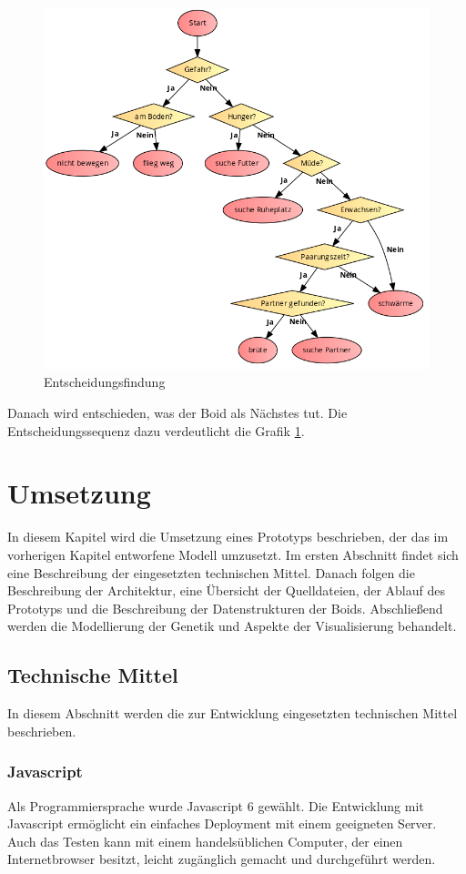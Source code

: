 \documentclass[draft=false
              ,paper=a4
              ,twoside=false
              ,fontsize=11pt
              ,headsepline
              ,BCOR10mm
              ,DIV11
              ,bibtotoc
              ,liststotoc
              ]{scrbook}
\begin{document}
\begin{figure}[!h]
\centering
\includegraphics[scale=0.6]{code2flow/entscheidungsfindung.png}
\caption{Entscheidungsfindung}
\label{entscheidung}
\end{figure}

Danach wird entschieden, was der Boid als Nächstes tut. Die Entscheidungssequenz dazu verdeutlicht die Grafik \ref{entscheidung}.

\chapter{Umsetzung}\label{umsetzung}
In diesem Kapitel wird die Umsetzung eines Prototyps beschrieben, der das im vorherigen Kapitel entworfene Modell umzusetzt. Im ersten Abschnitt findet sich eine Beschreibung der eingesetzten technischen Mittel. Danach folgen die Beschreibung der Architektur, eine Übersicht der Quelldateien, der Ablauf des Prototyps und die Beschreibung der Datenstrukturen der Boids. Abschließend werden die Modellierung der Genetik und Aspekte der Visualisierung behandelt.
\section{Technische Mittel}
In diesem Abschnitt werden die zur Entwicklung eingesetzten technischen Mittel beschrieben.
\subsection{Javascript}
Als Programmiersprache wurde Javascript 6 gewählt. Die Entwicklung mit Javascript ermöglicht ein einfaches Deployment mit einem geeigneten Server. Auch das Testen kann mit einem handelsüblichen Computer, der einen Internetbrowser besitzt, leicht zugänglich gemacht und durchgeführt werden.
\end{document}
